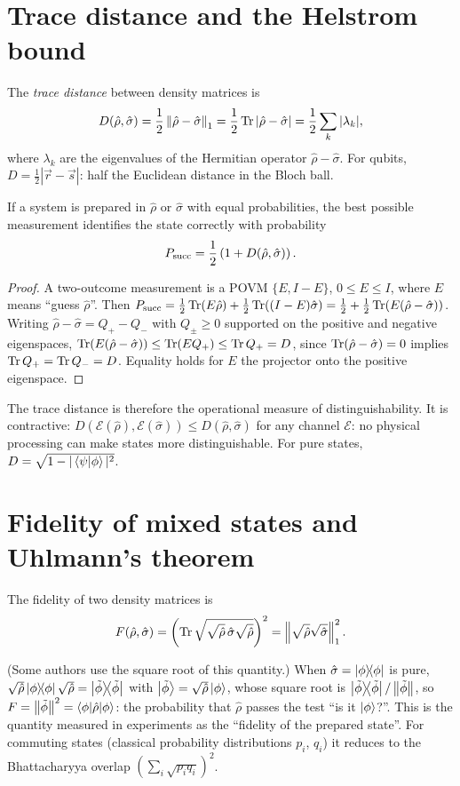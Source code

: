 \section{Trace distance and the Helstrom bound}
The \emph{trace distance} between density matrices is
\begin{equation}
  D(\hat\rho,\hat\sigma)=\frac12\left\|\hat\rho-\hat\sigma\right\|_1=\frac12\operatorname{Tr}\left|\hat\rho-\hat\sigma\right|=\frac12\sum_k|\lambda_k|,
\end{equation}
where $\lambda_k$ are the eigenvalues of the Hermitian operator $\hat\rho-\hat\sigma$. For qubits, $D=\frac12|\vec r-\vec s|$: half the Euclidean distance in the Bloch ball.
\begin{theorem}[Helstrom, 1969]
If a system is prepared in $\hat\rho$ or $\hat\sigma$ with equal probabilities, the best possible measurement identifies the state correctly with probability
\begin{equation}
  P_{\rm succ}=\frac12\left(1+D(\hat\rho,\hat\sigma)\right).
\end{equation}
\end{theorem}
\begin{proof}
A two-outcome measurement is a POVM $\{E,I-E\}$, $0\le E\le I$, where $E$ means ``guess $\hat\rho$''. Then $P_{\rm succ}=\frac12\operatorname{Tr}(E\hat\rho)+\frac12\operatorname{Tr}((I-E)\hat\sigma)=\frac12+\frac12\operatorname{Tr}(E(\hat\rho-\hat\sigma))$. Writing
$\hat\rho-\hat\sigma=Q_+-Q_-$ with $Q_\pm\ge0$ supported on the positive and negative eigenspaces, $\operatorname{Tr}(E(\hat\rho-\hat\sigma))\le\operatorname{Tr}(EQ_+)\le\operatorname{Tr} Q_+=D$, since $\operatorname{Tr}(\hat\rho-\hat\sigma)=0$ implies $\operatorname{Tr} Q_+=\operatorname{Tr} Q_-=D$. Equality holds for $E$ the projector onto the
positive eigenspace.
\end{proof}
The trace distance is therefore the operational measure of distinguishability. It is contractive: $D(\mathcal E(\hat\rho),\mathcal E(\hat\sigma))\le D(\hat\rho,\hat\sigma)$ for any channel $\mathcal E$: no physical processing can make states more distinguishable.
For pure states, $D=\sqrt{1-|\left\langle\psi\middle|\phi\right\rangle|^2}$.

\section{Fidelity of mixed states and Uhlmann's theorem}
\begin{definition}
The fidelity of two density matrices is
\begin{equation}
  F(\hat\rho,\hat\sigma)=\left(\operatorname{Tr}\sqrt{\sqrt{\hat\rho}\,\hat\sigma\sqrt{\hat\rho}}\right)^2=\left\|\sqrt{\hat\rho}\sqrt{\hat\sigma}\right\|_1^2 .
\end{equation}
\end{definition}
(Some authors use the square root of this quantity.) When $\hat\sigma=\left|\phi\middle\rangle\!\middle\langle\phi\right|$ is pure, $\sqrt{\hat\rho}\left|\phi\middle\rangle\!\middle\langle\phi\right|\sqrt{\hat\rho}=\left|\tilde\phi\middle\rangle\!\middle\langle\tilde\phi\right|$ with $\left|\tilde\phi\right\rangle=\sqrt{\hat\rho}\left|\phi\right\rangle$, whose square root is $\left|\tilde\phi\middle\rangle\!\middle\langle\tilde\phi\right|/\left\|\tilde\phi\right\|$, so
$F=\left\|\tilde\phi\right\|^2=\left\langle\phi\middle|\hat\rho\middle|\phi\right\rangle$: the probability that $\hat\rho$ passes the test ``is it $\left|\phi\right\rangle$?''. This is the quantity measured in experiments as the ``fidelity of the prepared state''. For commuting states (classical probability
distributions $p_i$, $q_i$) it reduces to the Bhattacharyya overlap $(\sum_i\sqrt{p_iq_i})^2$.

